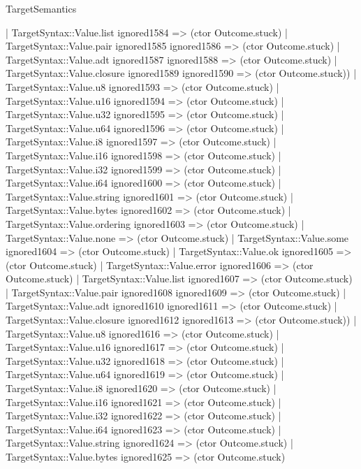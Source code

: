 \begin{lexlean}{TargetSemantics}
\begin{semanticmodule}
{                  | TargetSyntax::Value.list ignored1584 => (ctor Outcome.stuck)
                  | TargetSyntax::Value.pair ignored1585 ignored1586 => (ctor Outcome.stuck)
                  | TargetSyntax::Value.adt ignored1587 ignored1588 => (ctor Outcome.stuck)
                  | TargetSyntax::Value.closure ignored1589 ignored1590 => (ctor Outcome.stuck))
                | TargetSyntax::Value.u8 ignored1593 => (ctor Outcome.stuck)
                | TargetSyntax::Value.u16 ignored1594 => (ctor Outcome.stuck)
                | TargetSyntax::Value.u32 ignored1595 => (ctor Outcome.stuck)
                | TargetSyntax::Value.u64 ignored1596 => (ctor Outcome.stuck)
                | TargetSyntax::Value.i8 ignored1597 => (ctor Outcome.stuck)
                | TargetSyntax::Value.i16 ignored1598 => (ctor Outcome.stuck)
                | TargetSyntax::Value.i32 ignored1599 => (ctor Outcome.stuck)
                | TargetSyntax::Value.i64 ignored1600 => (ctor Outcome.stuck)
                | TargetSyntax::Value.string ignored1601 => (ctor Outcome.stuck)
                | TargetSyntax::Value.bytes ignored1602 => (ctor Outcome.stuck)
                | TargetSyntax::Value.ordering ignored1603 => (ctor Outcome.stuck)
                | TargetSyntax::Value.none => (ctor Outcome.stuck)
                | TargetSyntax::Value.some ignored1604 => (ctor Outcome.stuck)
                | TargetSyntax::Value.ok ignored1605 => (ctor Outcome.stuck)
                | TargetSyntax::Value.error ignored1606 => (ctor Outcome.stuck)
                | TargetSyntax::Value.list ignored1607 => (ctor Outcome.stuck)
                | TargetSyntax::Value.pair ignored1608 ignored1609 => (ctor Outcome.stuck)
                | TargetSyntax::Value.adt ignored1610 ignored1611 => (ctor Outcome.stuck)
                | TargetSyntax::Value.closure ignored1612 ignored1613 => (ctor Outcome.stuck))
              | TargetSyntax::Value.u8 ignored1616 => (ctor Outcome.stuck)
              | TargetSyntax::Value.u16 ignored1617 => (ctor Outcome.stuck)
              | TargetSyntax::Value.u32 ignored1618 => (ctor Outcome.stuck)
              | TargetSyntax::Value.u64 ignored1619 => (ctor Outcome.stuck)
              | TargetSyntax::Value.i8 ignored1620 => (ctor Outcome.stuck)
              | TargetSyntax::Value.i16 ignored1621 => (ctor Outcome.stuck)
              | TargetSyntax::Value.i32 ignored1622 => (ctor Outcome.stuck)
              | TargetSyntax::Value.i64 ignored1623 => (ctor Outcome.stuck)
              | TargetSyntax::Value.string ignored1624 => (ctor Outcome.stuck)
              | TargetSyntax::Value.bytes ignored1625 => (ctor Outcome.stuck)
}
\end{semanticmodule}
\end{lexlean}
